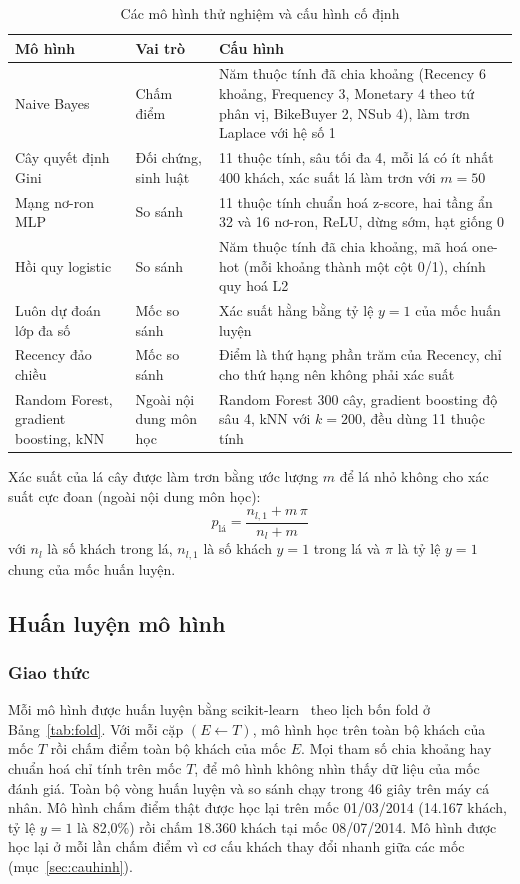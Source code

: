 \begin{table}[!htbp]
\centering
\caption{Các mô hình thử nghiệm và cấu hình cố định}
\label{tab:cacmohinh}
\footnotesize
\begin{tabular}{p{3.2cm}p{2.6cm}p{8.6cm}}
\toprule
Mô hình & Vai trò & Cấu hình \\
\midrule
Naive Bayes & Chấm điểm & Năm thuộc tính đã chia khoảng (Recency 6 khoảng, Frequency 3, Monetary 4 theo tứ phân vị, BikeBuyer 2, NSub 4), làm trơn Laplace với hệ số 1 \\
Cây quyết định Gini & Đối chứng, sinh luật & 11 thuộc tính, sâu tối đa 4, mỗi lá có ít nhất 400 khách, xác suất lá làm trơn với $m=50$ \\
Mạng nơ-ron MLP & So sánh & 11 thuộc tính chuẩn hoá z-score, hai tầng ẩn 32 và 16 nơ-ron, ReLU, dừng sớm, hạt giống 0 \\
Hồi quy logistic & So sánh & Năm thuộc tính đã chia khoảng, mã hoá one-hot (mỗi khoảng thành một cột 0/1), chính quy hoá L2 \\
Luôn dự đoán lớp đa số & Mốc so sánh & Xác suất hằng bằng tỷ lệ $y=1$ của mốc huấn luyện \\
Recency đảo chiều & Mốc so sánh & Điểm là thứ hạng phần trăm của Recency, chỉ cho thứ hạng nên không phải xác suất \\
Random Forest, gradient boosting, kNN & Ngoài nội dung môn học & Random Forest 300 cây, gradient boosting độ sâu 4, kNN với $k=200$, đều dùng 11 thuộc tính \\
\bottomrule
\end{tabular}
\end{table}

Xác suất của lá cây được làm trơn bằng ước lượng $m$ để lá nhỏ không cho xác suất cực đoan (ngoài nội dung môn học):
\begin{equation}
    p_{\text{lá}} = \frac{n_{l,1} + m\,\pi}{n_l + m}
\end{equation}
với $n_l$ là số khách trong lá, $n_{l,1}$ là số khách $y=1$ trong lá và $\pi$ là tỷ lệ $y=1$ chung của mốc huấn luyện.

\subsection{Huấn luyện mô hình}
\subsubsection{Giao thức}
Mỗi mô hình được huấn luyện bằng scikit-learn~\cite{pedregosa2011} theo lịch bốn fold ở Bảng~\ref{tab:fold}. Với mỗi cặp $(E \leftarrow T)$, mô hình học trên toàn bộ khách của mốc $T$ rồi chấm điểm toàn bộ khách của mốc $E$. Mọi tham số chia khoảng hay chuẩn hoá chỉ tính trên mốc $T$, để mô hình không nhìn thấy dữ liệu của mốc đánh giá. Toàn bộ vòng huấn luyện và so sánh chạy trong 46 giây trên máy cá nhân. Mô hình chấm điểm thật được học lại trên mốc 01/03/2014 (14.167 khách, tỷ lệ $y=1$ là 82,0\%) rồi chấm 18.360 khách tại mốc 08/07/2014. Mô hình được học lại ở mỗi lần chấm điểm vì cơ cấu khách thay đổi nhanh giữa các mốc (mục~\ref{sec:cauhinh}).

